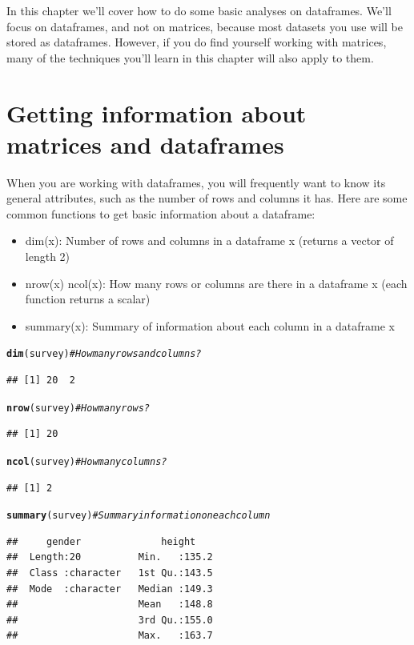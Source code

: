 \documentclass{tufte-book}\usepackage[]{graphicx}\usepackage[]{color}
\makeatletter
\newcommand{\hlcom}[1]{\textcolor[rgb]{0.678,0.584,0.686}{\textit{#1}}}%
\newcommand{\hlstd}[1]{\textcolor[rgb]{0.345,0.345,0.345}{#1}}%
\newcommand{\hlkwd}[1]{\textcolor[rgb]{0.737,0.353,0.396}{\textbf{#1}}}%
\newenvironment{kframe}{%
 \def\at@end@of@kframe{}%
 \ifinner\ifhmode%
  \def\at@end@of@kframe{\end{minipage}}%
  \begin{minipage}{\columnwidth}%
 \fi\fi%
 \def\FrameCommand##1{\hskip\@totalleftmargin \hskip-\fboxsep
 \colorbox{shadecolor}{##1}\hskip-\fboxsep
     \hskip-\linewidth \hskip-\@totalleftmargin \hskip\columnwidth}%
 \MakeFramed {\advance\hsize-\width
   \@totalleftmargin\z@ \linewidth\hsize
   \@setminipage}}%
 {\par\unskip\endMakeFramed%
 \at@end@of@kframe}
\newenvironment{knitrout}{}{} %
\makeatother
\begin{document}
\begin{footnotesize}
In this chapter we'll cover how to do some basic analyses on dataframes. We'll focus on dataframes, and not on matrices, because most datasets you use will be stored as dataframes. However, if you do find yourself working with matrices, many of the techniques you'll learn in this chapter will also apply to them.


\section{Getting information about matrices and dataframes}

When you are working with dataframes, you will frequently want to know its general attributes, such as the number of rows and columns it has. Here are some common functions to get basic information about a dataframe:

\begin{itemize}
  \item dim(x): Number of rows and columns in a dataframe x (returns a vector of length 2)
  \item nrow(x) ncol(x): How many rows or columns are there in a dataframe x (each function returns a scalar)
  \item summary(x): Summary of information about each column in a dataframe x
\end{itemize}


\begin{footnotesize}
\begin{knitrout}
\color{fgcolor}\begin{kframe}
\begin{alltt}
\hlkwd{dim}\hlstd{(survey)} \hlcom{# How many rows and columns?}
\end{alltt}
\begin{verbatim}
## [1] 20  2
\end{verbatim}
\begin{alltt}
\hlkwd{nrow}\hlstd{(survey)} \hlcom{# How many rows?}
\end{alltt}
\begin{verbatim}
## [1] 20
\end{verbatim}
\begin{alltt}
\hlkwd{ncol}\hlstd{(survey)} \hlcom{# How many columns?}
\end{alltt}
\begin{verbatim}
## [1] 2
\end{verbatim}
\begin{alltt}
\hlkwd{summary}\hlstd{(survey)} \hlcom{# Summary information on each column}
\end{alltt}
\begin{verbatim}
##     gender              height     
##  Length:20          Min.   :135.2  
##  Class :character   1st Qu.:143.5  
##  Mode  :character   Median :149.3  
##                     Mean   :148.8  
##                     3rd Qu.:155.0  
##                     Max.   :163.7
\end{verbatim}
\end{kframe}
\end{knitrout}
\end{footnotesize}


\end{footnotesize}
\end{document}
